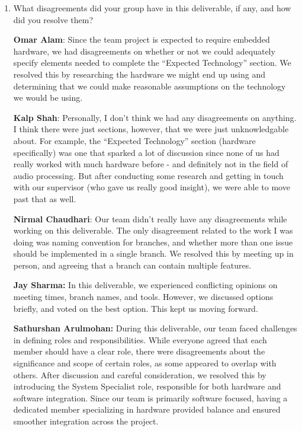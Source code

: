 \documentclass{article}
\begin{document}
\begin{enumerate}
    \item What disagreements did your group have in this deliverable, if any,
    and how did you resolve them?

    \textbf{Omar Alam}: Since the team project is expected to require embedded
    hardware, we had disagreements on whether or not we could adequately specify
    elements needed to complete the ``Expected Technology'' section. We resolved
    this by researching the hardware we might end up using and determining that
    we could make reasonable assumptions on the technology we would be using.

    \textbf{Kalp Shah}: Personally, I don't think we had any disagreements on
    anything. I think there were just sections, however, that we were just
    unknowledgable about. For example, the ``Expected Technology'' section
    (hardware specifically) was one that sparked a lot of discussion since none
    of us had really worked with much hardware before - and definitely not in
    the field of audio processing. But after conducting some research and
    getting in touch with our supervisor (who gave us really good insight), we
    were able to move past that as well. 
    
    \textbf{Nirmal Chaudhari}: Our team didn't really have any disagreements
    while working on this deliverable. The only disagreement related to the work
    I was doing was naming convention for branches, and whether more than one
    issue should be implemented in a single branch. We resolved this by meeting
    up in person, and agreeing that a branch can contain multiple features. 
    
    \textbf{Jay Sharma:} In this deliverable, we experienced conflicting
    opinions on meeting times, branch names, and tools. However, we discussed
    options briefly, and voted on the best option. This kept us moving forward.

    \textbf{Sathurshan Arulmohan:} During this deliverable, our team faced
    challenges in defining roles and responsibilities. While everyone agreed
    that each member should have a clear role, there were disagreements about
    the significance and scope of certain roles, as some appeared to overlap
    with others. After discussion and careful consideration, we resolved this by
    introducing the System Specialist role, responsible for both hardware and
    software integration. Since our team is primarily software focused, having a
    dedicated member specializing in hardware provided balance and ensured
    smoother integration across the project.

\end{enumerate}
\end{document}

